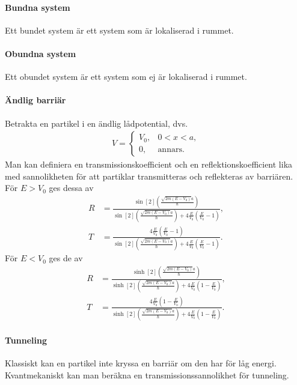 \paragraph{Bundna system}
Ett bundet system är ett system som är lokaliserad i rummet.

\paragraph{Obundna system}
Ett obundet system är ett system som ej är lokaliserad i rummet.

\paragraph{Ändlig barriär}
Betrakta en partikel i en ändlig lådpotential, dvs.
\begin{align*}
	V = 
	\begin{cases}
		V_{0}, &0 < x < a, \\
		0,     &\text{annars.}
	\end{cases}
\end{align*}
Man kan definiera en transmissionskoefficient och en reflektionskoefficient lika med sannolikheten för att partiklar transmitteras och reflekteras av barriären. För $E > V_{0}$ ges dessa av
\begin{align*}
	R &= \frac{\sin[2](\frac{\sqrt{2m(E - V_{0})}a}{\hbar})}{\sin[2](\frac{\sqrt{2m(E - V_{0})}a}{\hbar}) + 4\frac{E}{V_{0}}\left(\frac{E}{V_{0}} - 1\right)}, \\
	T &= \frac{4\frac{E}{V_{0}}\left(\frac{E}{V_{0}} - 1\right)}{\sin[2](\frac{\sqrt{2m(E - V_{0})}a}{\hbar}) + 4\frac{E}{V_{0}}\left(\frac{E}{V_{0}} - 1\right)}.
\end{align*}
För $E < V_{0}$ ges de av
\begin{align*}
	R &= \frac{\sinh[2](\frac{\sqrt{2m(E - V_{0})}a}{\hbar})}{\sinh[2](\frac{\sqrt{2m(E - V_{0})}a}{\hbar}) + 4\frac{E}{V_{0}}\left(1 - \frac{E}{V_{0}}\right)}, \\
	T &= \frac{4\frac{E}{V_{0}}\left(1 - \frac{E}{V_{0}}\right)}{\sinh[2](\frac{\sqrt{2m(E - V_{0})}a}{\hbar}) + 4\frac{E}{V_{0}}\left(1 - \frac{E}{V_{0}}\right)}.
\end{align*}

\paragraph{Tunneling}
Klassiskt kan en partikel inte kryssa en barriär om den har för låg energi. Kvantmekaniskt kan man beräkna en transmissionssannolikhet för tunneling.

